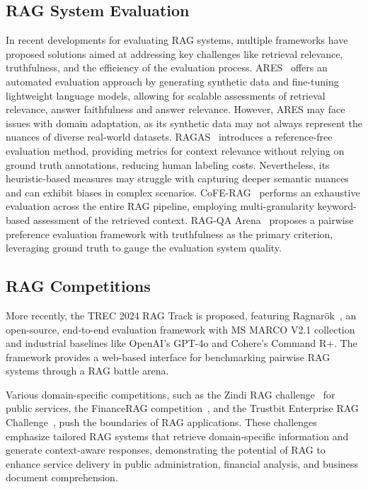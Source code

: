\subsection{RAG System Evaluation}
In recent developments for evaluating RAG systems, multiple frameworks have proposed solutions aimed at addressing key challenges like retrieval relevance, truthfulness, and the efficiency of the evaluation process. ARES~\cite{saadfalcon2023ares} offers an automated evaluation approach by generating synthetic data and fine-tuning lightweight language models, allowing for scalable assessments of retrieval relevance, answer faithfulness and answer relevance. However, ARES may face issues with domain adaptation, as its synthetic data may not always represent the nuances of diverse real-world datasets. RAGAS~\cite{es-etal-2024-ragas} introduces a reference-free evaluation method, providing metrics for context relevance without relying on ground truth annotations, reducing human labeling costs. Nevertheless, its heuristic-based measures may struggle with capturing deeper semantic nuances and can exhibit biases in complex scenarios. CoFE-RAG~\cite{liu2024cofe} performs an exhaustive evaluation across the entire RAG pipeline, employing multi-granularity keyword-based assessment of the retrieved context. RAG-QA Arena~\cite{han2024rag} proposes a pairwise preference evaluation framework with truthfulness as the primary criterion, leveraging ground truth to gauge the evaluation system quality.

\subsection{RAG Competitions}
More recently, the TREC 2024 RAG Track is proposed, featuring Ragnarök~\cite{pradeep2024ragnar}, an open-source, end-to-end evaluation framework with MS MARCO V2.1 collection and industrial baselines like OpenAI's GPT-4o and Cohere's Command R+. The framework provides a web-based interface for benchmarking pairwise RAG systems through a RAG battle arena.

Various domain-specific competitions, such as the Zindi RAG challenge~\cite{zindi_rag_competition} for public services, the FinanceRAG competition~\cite{finance_rag_challenge}, and the Trustbit Enterprise RAG Challenge~\cite{trustbit_enterprise_rag_challenge}, push the boundaries of RAG applications. These challenges emphasize tailored RAG systems that retrieve domain-specific information and generate context-aware responses, demonstrating the potential of RAG to enhance service delivery in public administration, financial analysis, and business document comprehension.